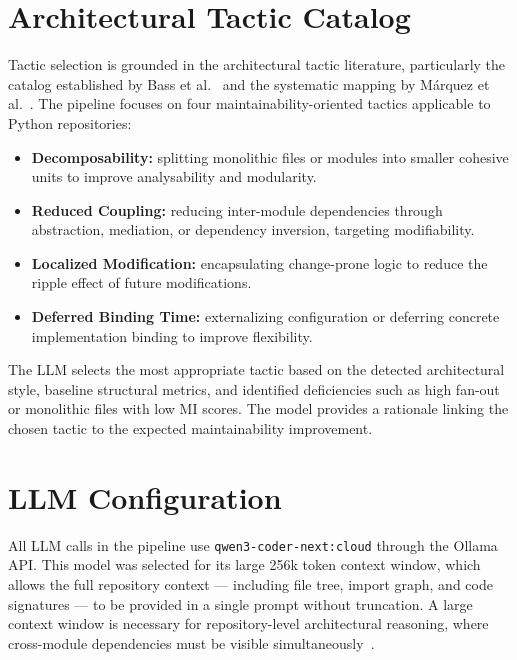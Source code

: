 \section{Architectural Tactic Catalog}
\label{sec:met_tactics}

Tactic selection is grounded in the architectural tactic literature, particularly the catalog established by Bass et al.~\cite{bass2021software} and the systematic mapping by M\'arquez et al.~\cite{marquez2022architectural}. The pipeline focuses on four maintainability-oriented tactics applicable to Python repositories:

\begin{itemize}
    \item \textbf{Decomposability:} splitting monolithic files or modules into smaller cohesive units to improve analysability and modularity.
    \item \textbf{Reduced Coupling:} reducing inter-module dependencies through abstraction, mediation, or dependency inversion, targeting modifiability.
    \item \textbf{Localized Modification:} encapsulating change-prone logic to reduce the ripple effect of future modifications.
    \item \textbf{Deferred Binding Time:} externalizing configuration or deferring concrete implementation binding to improve flexibility.
\end{itemize}

The LLM selects the most appropriate tactic based on the detected architectural style, baseline structural metrics, and identified deficiencies such as high fan-out or monolithic files with low MI scores. The model provides a rationale linking the chosen tactic to the expected maintainability improvement.

\section{LLM Configuration}
\label{sec:met_llm}

All LLM calls in the pipeline use \texttt{qwen3-coder-next:cloud} through the Ollama API. This model was selected for its large 256k token context window, which allows the full repository context — including file tree, import graph, and code signatures — to be provided in a single prompt without truncation. A large context window is necessary for repository-level architectural reasoning, where cross-module dependencies must be visible simultaneously~\cite{piao2025refactoring}.

